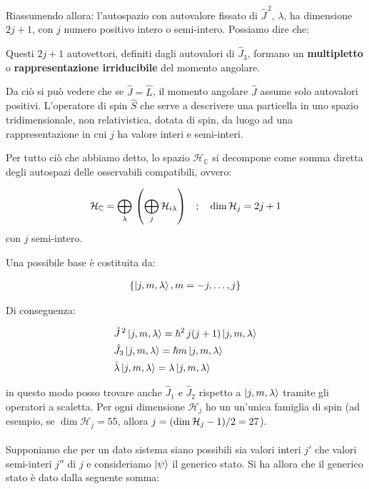 	Riassumendo allora: l'autospazio con autovalore fissato di $\hat{J}^{\, 2}$, $\lambda$, ha dimensione $2j + 1$, con $j$ numero positivo intero o semi-intero. Possiamo dire che:

\begin{mydef}
	Questi $2j + 1$ autovettori, definiti dagli autovalori di $\hat{J}_3$, formano un \textbf{multipletto} o \textbf{rappresentazione irriducibile} del momento angolare. 
\end{mydef}
	
	Da ciò si può vedere che se $\hat{J} = \hat{L}$, il momento angolare $\hat{J}$ assume solo autovalori positivi. L'operatore di spin $\hat{S}$ che serve a descrivere una particella in uno spazio tridimensionale, non relativistica, dotata di spin, da luogo ad una rappresentazione in cui $j$ ha valore interi e semi-interi. 

\begin{nb}
	Per tutto ciò che abbiamo detto, lo spazio $\mathcal{H}_{\mathbb{C}}$ si decompone come somma diretta degli autospazi delle osservabili compatibili, ovvero:
	
\begin{align*}
	\mathcal{H}_{\mathbb{C}} = \bigoplus_{\lambda} \, \qty(\bigoplus_j \mathcal{H}_{i\lambda}) \quad ; \quad \dim \mathcal{H}_j = 2j +1 
\end{align*}
	con $j$ semi-intero.
\end{nb}

	Una possibile base è costituita da:
	
\begin{align*}
	\qty{ \ket{j, m, \lambda}, m = -j, \ldots, j}
\end{align*}

	Di conseguenza:
	
\begin{align*}
	& \hat{J}^{\, 2} \ket{j, m, \lambda} = \hbar^2 \, j(j+1) \ket{j, m, \lambda}  \\
	& \hat{J}_3  \ket{j, m, \lambda} = \hbar m \ket{j, m, \lambda} \\
	& \hat{\lambda}  \ket{j, m, \lambda} = \lambda  \ket{j, m, \lambda}
\end{align*}

	in questo modo posso trovare anche $\hat{J}_1$ e $\hat{J}_2$ rispetto a $\ket{j, m, \lambda}$ tramite gli operatori a scaletta. Per ogni dimensione $\mathcal{H}_j$ ho un un'unica famiglia di spin (ad esempio, se $\dim \mathcal{H}_j = 55$, allora $j = \qty(\dim\mathcal{H}_j -1)/2 = 27 $).
	\\
	\\
	Supponiamo che per un dato sistema siano possibili sia valori interi $j'$ che valori semi-interi $j''$ di $j$ e consideriamo $\ket{\psi}$ il generico stato. Si ha allora che il generico stato è dato dalla seguente somma:
	
